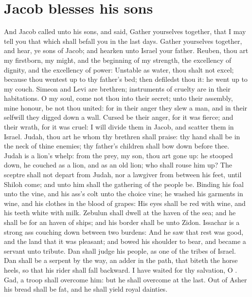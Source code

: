 \section*{Jacob blesses his sons}
\begin{biblechapter} %
\verse And Jacob called unto his sons, and said, Gather yourselves together, that I may tell you that which shall befall you in the last days.
\verse Gather yourselves together, and hear, ye sons of Jacob; and hearken unto Israel your father.
\verse Reuben, thou art my firstborn, my might, and the beginning of my strength, the excellency of dignity, and the excellency of power:
\verse Unstable as water, thou shalt not excel; because thou wentest up to thy father's bed; then defiledst thou it: he went up to my couch.
\verse Simeon and Levi are brethren; instruments of cruelty are in their habitations.
\verse O my soul, come not thou into their secret; unto their assembly, mine honour, be not thou united: for in their anger they slew a man, and in their selfwill they digged down a wall.
\verse Cursed be their anger, for it was fierce; and their wrath, for it was cruel: I will divide them in Jacob, and scatter them in Israel.
\verse Judah, thou art he whom thy brethren shall praise: thy hand shall be in the neck of thine enemies; thy father's children shall bow down before thee.
\verse Judah is a lion's whelp: from the prey, my son, thou art gone up: he stooped down, he couched as a lion, and as an old lion; who shall rouse him up?
\verse The sceptre shall not depart from Judah, nor a lawgiver from between his feet, until Shiloh come; and unto him shall the gathering of the people be.
\verse Binding his foal unto the vine, and his ass's colt unto the choice vine; he washed his garments in wine, and his clothes in the blood of grapes:
\verse His eyes shall be red with wine, and his teeth white with milk.
\verse Zebulun shall dwell at the haven of the sea; and he shall be for an haven of ships; and his border shall be unto Zidon.
\verse Issachar is a strong ass couching down between two burdens:
\verse And he saw that rest was good, and the land that it was pleasant; and bowed his shoulder to bear, and became a servant unto tribute.
\verse Dan shall judge his people, as one of the tribes of Israel.
\verse Dan shall be a serpent by the way, an adder in the path, that biteth the horse heels, so that his rider shall fall backward.
\verse I have waited for thy salvation, O \LORD.
\verse Gad, a troop shall overcome him: but he shall overcome at the last.
\verse Out of Asher his bread shall be fat, and he shall yield royal dainties.

\end{biblechapter}

